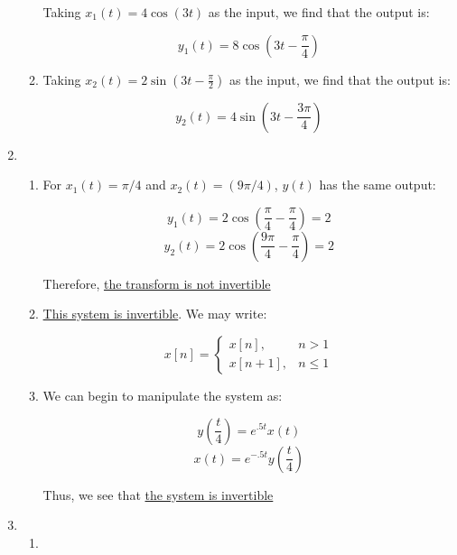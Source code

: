 \begin{enumerate}
\begin{enumerate}[label=\textbf{\alph*.}]
        Taking $x_1(t)=4\cos(3t)$ as the input, we find that the output is:

        $$\boxed{y_1(t)=8\cos\left( 3t-\frac{\pi}{4} \right)}$$

      \item 

        Taking $x_2(t)=2\sin\left(3t-\frac{\pi}{2}\right)$ as the input, we find that the output is:

        $$\boxed{y_2(t)=4\sin\left( 3t-\frac{3\pi}{4} \right)}$$

    \end{enumerate}

  \item

    \begin{enumerate}[label=\textbf{\alph*)}]

      \item 

        For $x_1(t)=\pi/4$ and $x_2(t)=(9\pi/4)$, $y(t)$ has the same output:

        $$y_1(t)=2\cos\left( \frac{\pi}{4}-\frac{\pi}{4} \right)=2$$
        $$y_2(t)=2\cos\left( \frac{9\pi}{4}-\frac{\pi}{4} \right)=2$$

        Therefore, \underline{the transform is not invertible}

      \item 

        \underline{This system is invertible}. We may write:

        $$x[n]=\left\{\begin{matrix} x[n], & n > 1\\ x[n+1], & n \leq 1\end{matrix}$$

      \item 

        We can begin to manipulate the system as:

        $$y\left( \frac{t}{4} \right)=e^{.5t}x(t)$$
        $$x(t)=e^{-.5t}y\left( \frac{t}{4} \right)$$

        Thus, we see that \underline{the system is invertible}

    \end{enumerate}

  \item

    \begin{enumerate}

      \item 


\end{enumerate}
\end{enumerate}
